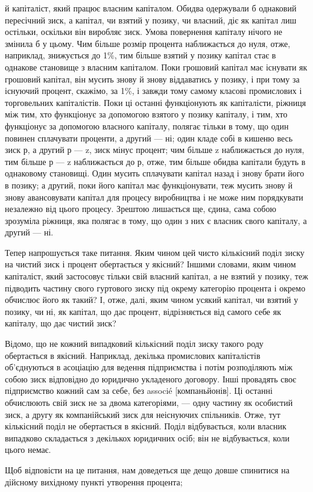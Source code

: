 й капіталіст, який працює власним капіталом. Обидва одержували
б однаковий пересічний зиск, а капітал, чи взятий у позику,
чи власний, діє як капітал лиш остільки, оскільки він
виробляє зиск. Умова повернення капіталу нічого не змінила б
у цьому. Чим більше розмір процента наближається до нуля,
отже, наприклад, знижується до 1\%, тим більше взятий у позику
капітал стає в однакове становище з власним капіталом.
Поки грошовий капітал має існувати як грошовий капітал,
він мусить знову й знову віддаватись у позику, і при тому
за існуючий процент, скажімо, за 1\%, і завжди тому самому
класові промислових і торговельних капіталістів. Поки ці останні
функціонують як капіталісти, ріжниця між тим, хто функціонує
за допомогою взятого у позику капіталу, і тим, хто функціонує за
допомогою власного капіталу, полягає тільки в тому, що один
повинен сплачувати проценти, а другий — ні; один кладе собі в
кишеню весь зиск р, а другий р — z, зиск мінус процент; чим
більше z наближається до нуля, тим більше р — z наближається
до р, отже, тим більше обидва капітали будуть в однаковому
становищі. Один мусить сплачувати капітал назад і знову брати
його в позику; а другий, поки його капітал має функціонувати,
теж мусить знову й знову авансовувати капітал для процесу
виробництва і не може ним порядкувати незалежно від цього
процесу. Зрештою лишається ще, єдина, сама собою зрозуміла
ріжниця, яка полягає в тому, що один з них є власник свого капіталу,
а другий — ні.

Тепер напрошується таке питання. Яким чином цей чисто
кількісний поділ зиску на чистий зиск і процент обертається
у якісний? Іншими словами, яким чином капіталіст, який застосовує
тільки свій власний капітал, а не взятий у позику, теж
підводить частину свого гуртового зиску під окрему категорію
процента і окремо обчислює його як такий? І, отже, далі, яким
чином усякий капітал, чи взятий у позику, чи ні, як капітал,
що дає процент, відрізняється від самого себе як капіталу, що
дає чистий зиск?

Відомо, що не кожний випадковий кількісний поділ зиску
такого роду обертається в якісний. Наприклад, декілька промислових
капіталістів об’єднуються в асоціацію для ведення підприємства
і потім розподіляють між собою зиск відповідно до
юридично укладеного договору. Інші провадять своє підприємство
кожний сам за себе, без associé [компаньйонів]. Ці останні
обчислюють свій зиск не за двома категоріями, — одну частину
як особистий зиск, а другу як компанійський зиск для неіснуючих
спільників. Отже, тут кількісний поділ не обертається
в якісний. Поділ відбувається, коли власник випадково складається
з декількох юридичних осіб; він не відбувається, коли
цього немає.

Щоб відповісти на це питання, нам доведеться ще дещо довше
спинитися на дійсному вихідному пункті утворення процента;
